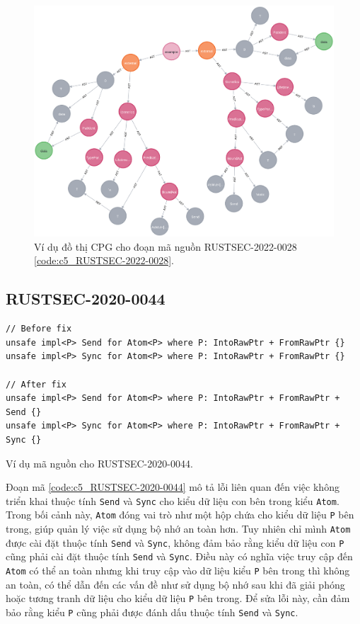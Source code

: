 \begin{figure}[H]
    \includegraphics[width=1\columnwidth]{figures/c5/c5_RUSTSEC-2022-0028.png}
    \centering
    \caption{Ví dụ đồ thị CPG cho đoạn mã nguồn RUSTSEC-2022-0028 \ref{code:c5_RUSTSEC-2022-0028}.}
    \label{img:c5_RUSTSEC-2022-0028}
\end{figure}


\subsection{RUSTSEC-2020-0044}


\begin{listing}[H]
\begin{verbatim}
// Before fix
unsafe impl<P> Send for Atom<P> where P: IntoRawPtr + FromRawPtr {}
unsafe impl<P> Sync for Atom<P> where P: IntoRawPtr + FromRawPtr {}

// After fix
unsafe impl<P> Send for Atom<P> where P: IntoRawPtr + FromRawPtr + Send {}
unsafe impl<P> Sync for Atom<P> where P: IntoRawPtr + FromRawPtr + Sync {}
\end{verbatim}
\caption{Ví dụ mã nguồn cho RUSTSEC-2020-0044.}
\label{code:c5_RUSTSEC-2020-0044}
\end{listing}

Đoạn mã \ref{code:c5_RUSTSEC-2020-0044} mô tả lỗi liên quan đến việc không triển khai thuộc tính \texttt{Send} và \texttt{Sync} cho kiểu dữ liệu con bên trong kiểu \texttt{Atom}.
Trong bối cảnh này, \texttt{Atom} đóng vai trò như một hộp chứa cho kiểu dữ liệu \texttt{P} bên trong, giúp quản lý việc sử dụng bộ nhớ an toàn hơn.
Tuy nhiên chỉ mình \texttt{Atom} được cài đặt thuộc tính \texttt{Send} và \texttt{Sync}, không đảm bảo rằng kiểu dữ liệu con \texttt{P} cũng phải cài đặt thuộc tính \texttt{Send} và \texttt{Sync}.
Điều này có nghĩa việc truy cập đến \texttt{Atom} có thể an toàn nhưng khi truy cập vào dữ liệu kiểu \texttt{P} bên trong thì không an toàn, có thể dẫn đến các vấn đề như sử dụng bộ nhớ sau khi đã giải phóng hoặc tương tranh dữ liệu cho kiểu dữ liệu \texttt{P} bên trong.
Để sửa lỗi này, cần đảm bảo rằng kiểu \texttt{P} cũng phải được đánh dấu thuộc tính \texttt{Send} và \texttt{Sync}.

